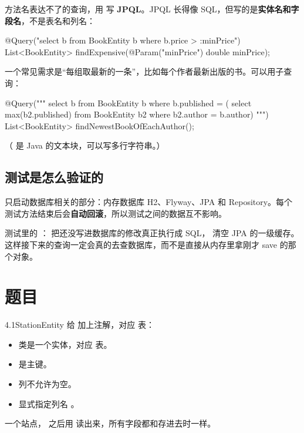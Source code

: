 方法名表达不了的查询，用  写 \textbf{JPQL}。JPQL 长得像 SQL，但写的是\textbf{实体名和字段名}，不是表名和列名：

\begin{java}
@Query("select b from BookEntity b where b.price > :minPrice")
List<BookEntity> findExpensive(@Param("minPrice") double minPrice);
\end{java}

一个常见需求是“每组取最新的一条”，比如每个作者最新出版的书。可以用子查询：

\begin{java}
@Query("""
        select b from BookEntity b
        where b.published = (
            select max(b2.published) from BookEntity b2
            where b2.author = b.author)
        """)
List<BookEntity> findNewestBookOfEachAuthor();
\end{java}

（ 是 Java 的文本块，可以写多行字符串。）

\subsection{测试是怎么验证的}

 只启动数据库相关的部分：内存数据库 H2、Flyway、JPA 和 Repository。每个测试方法结束后会\textbf{自动回滚}，所以测试之间的数据互不影响。

测试里的 ： 把还没写进数据库的修改真正执行成 SQL， 清空 JPA 的一级缓存。这样接下来的查询一定会真的去查数据库，而不是直接从内存里拿刚才 save 的那个对象。

\section{题目}

\begin{task}{4.1\quad StationEntity}
给  加上注解，对应  表：
\begin{itemize}
  \item 类是一个实体，对应  表。
  \item {} 是主键。
  \item {} 列不允许为空。
  \item {} 显式指定列名 。
\end{itemize}

\begin{example}
 一个站点， 之后用  读出来，所有字段都和存进去时一样。
\end{example}
\end{task}

